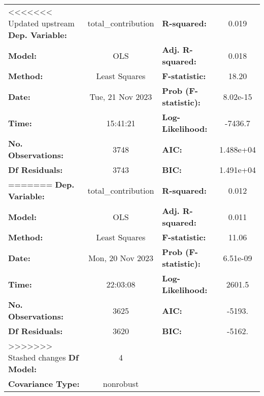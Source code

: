\begin{center}
\begin{tabular}{lclc}
\toprule
<<<<<<< Updated upstream
\textbf{Dep. Variable:}                & total\_contribution & \textbf{  R-squared:         } &     0.019   \\
\textbf{Model:}                        &         OLS         & \textbf{  Adj. R-squared:    } &     0.018   \\
\textbf{Method:}                       &    Least Squares    & \textbf{  F-statistic:       } &     18.20   \\
\textbf{Date:}                         &   Tue, 21 Nov 2023  & \textbf{  Prob (F-statistic):} &  8.02e-15   \\
\textbf{Time:}                         &       15:41:21      & \textbf{  Log-Likelihood:    } &   -7436.7   \\
\textbf{No. Observations:}             &          3748       & \textbf{  AIC:               } & 1.488e+04   \\
\textbf{Df Residuals:}                 &          3743       & \textbf{  BIC:               } & 1.491e+04   \\
=======
\textbf{Dep. Variable:}                & total\_contribution & \textbf{  R-squared:         } &     0.012   \\
\textbf{Model:}                        &         OLS         & \textbf{  Adj. R-squared:    } &     0.011   \\
\textbf{Method:}                       &    Least Squares    & \textbf{  F-statistic:       } &     11.06   \\
\textbf{Date:}                         &   Mon, 20 Nov 2023  & \textbf{  Prob (F-statistic):} &  6.51e-09   \\
\textbf{Time:}                         &       22:03:08      & \textbf{  Log-Likelihood:    } &    2601.5   \\
\textbf{No. Observations:}             &          3625       & \textbf{  AIC:               } &    -5193.   \\
\textbf{Df Residuals:}                 &          3620       & \textbf{  BIC:               } &    -5162.   \\
>>>>>>> Stashed changes
\textbf{Df Model:}                     &             4       & \textbf{                     } &             \\
\textbf{Covariance Type:}              &      nonrobust      & \textbf{                     } &             \\
\bottomrule

\end{tabular}
\end{center}
